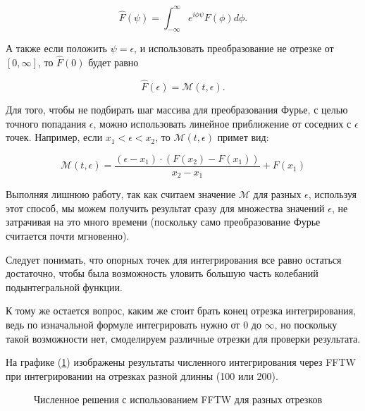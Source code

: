 \documentclass[%
bachelor,    %
natbib,      %
subf,        %
href,        %
colorlinks,  %
]{disser}
\newcommand{\cM}{\mathcal{M}}
\begin{document}
$$
\hat{F}(\psi) = \int_{-\infty}^{\infty} e^{i \phi \psi} F(\phi) d\phi.
$$

А также если положить $\psi = \epsilon$, и использовать преобразование не отрезке от $[0, \infty]$, то $\hat{F}(0)$ будет равно

$$
\hat{F}(\epsilon) = \cM(t, \epsilon).
$$

Для того, чтобы не подбирать шаг массива для преобразования Фурье, с целью точного попадания $\epsilon$, можно использовать линейное приближение от соседних с $\epsilon$ точек. Например, если $x_1<\epsilon<x_2$, то $\cM(t, \epsilon)$ примет вид: 

\begin{equation}\label{eq:approx}
	\cM(t, \epsilon) = \frac{(\epsilon - x_1) \cdot (F(x_2) - F(x_1))}{x_2 - x_1} + F(x_1)
\end{equation}

Выполняя лишнюю работу, так как считаем значение $\cM$ для разных $\epsilon$, используя этот способ, мы можем получить результат сразу для множества значений $\epsilon$, не затрачивая на это много времени (поскольку само преобразование Фурье считается почти мгновенно).

Следует понимать, что опорных точек для интегрирования все равно остаться достаточно, чтобы была возможность уловить большую часть колебаний подынтегральной функции.

К тому же остается вопрос, каким же стоит брать конец отрезка интегрирования, ведь по изначальной формуле интегрировать нужно от 0 до $\infty$, но поскольку такой возможности нет, смоделируем различные отрезки для проверки результата.

На графике (\ref{ris:fftw_compare}) изображены результаты численного интегрирования через FFTW при интегрировании на отрезках разной длинны (100 или 200). 

\begin{figure}[h]
	\caption{Численное решения с использованием FFTW для разных отрезков}
	\label{ris:fftw_compare}
\end{figure}
\end{document}
